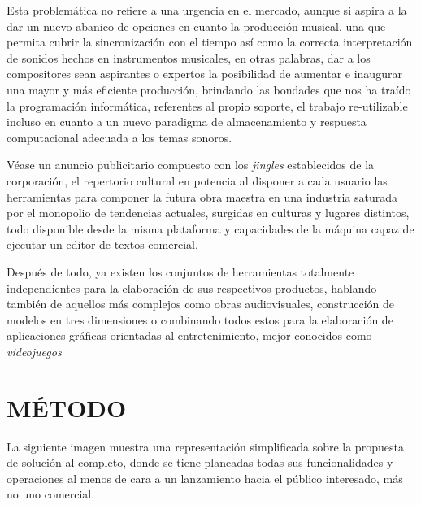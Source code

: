 \documentclass{book}
\begin{document}
	Esta problemática no refiere a una urgencia en el mercado, aunque si aspira a la dar un nuevo abanico de opciones en cuanto la producción musical, una que permita cubrir la sincronización con el tiempo así como la correcta interpretación de sonidos hechos en instrumentos musicales, en otras palabras, dar a los compositores sean aspirantes o expertos la posibilidad de aumentar e inaugurar una mayor y más eficiente producción, brindando las bondades que nos ha traído la programación informática, referentes al propio soporte, el trabajo re-utilizable incluso en cuanto a un nuevo paradigma de almacenamiento y respuesta computacional adecuada a los temas sonoros.\par
	
	Véase un anuncio publicitario compuesto con los \emph{jingles} establecidos de la corporación, el repertorio cultural en potencia al disponer a cada usuario las herramientas para componer la futura obra maestra en una industria saturada por el monopolio de tendencias actuales, surgidas en culturas y lugares distintos, todo disponible desde la misma plataforma y capacidades de la máquina capaz de ejecutar un editor de textos comercial.\par
	
	Después de todo, ya existen los conjuntos de herramientas totalmente independientes para la elaboración de sus respectivos productos, hablando también de aquellos más complejos como obras audiovisuales, construcción de modelos en tres dimensiones o combinando todos estos para la elaboración de aplicaciones gráficas orientadas al entretenimiento, mejor conocidos como \emph{videojuegos}\par
	
	\pagebreak
	\section*{MÉTODO}
	La siguiente imagen muestra una representación simplificada sobre la propuesta de solución al completo, donde se tiene planeadas todas sus funcionalidades y operaciones al menos de cara a un lanzamiento hacia el público interesado, más no uno comercial.\par
	
\end{document}
